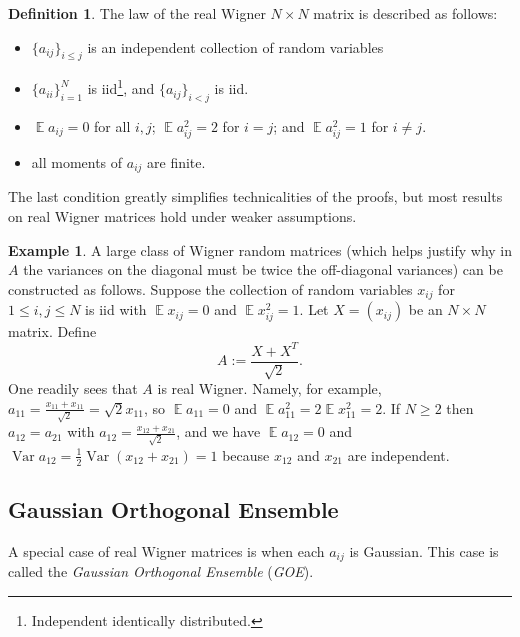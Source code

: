 \documentclass[letterpaper,11pt,oneside,reqno]{amsart}
\numberwithin{equation}{section}
\DeclareMathOperator{\EE}{\mathbb{E}}
\DeclareMathOperator{\VAR}{\mathrm{Var}}
\theoremstyle{definition}
\newtheorem{definition}[proposition]{Definition}
\newtheorem{example}[proposition]{Example}
\begin{document}
\begin{definition}\label{def:real_Wigner}
The law of the real Wigner $N\times N$ matrix is described as follows:
\begin{itemize}
	\item $\{a_{ij}\}_{i\leq j}$ is an independent collection of random variables
	\item $\{a_{ii}\}_{i=1}^N$ is iid\footnote{Independent identically
	distributed.}, and $\{a_{ij}\}_{i<j}$ is iid.
	\item $\EE a_{ij}=0$ for all $i,j$; $\EE a_{ij}^2=2$ for $i=j$; and $\EE a_{ij}^2=1$ for $i\neq j$.
	\item all moments of $a_{ij}$ are finite.
\end{itemize}
The last condition greatly simplifies technicalities of the proofs,
but most results on real Wigner matrices hold under weaker assumptions.
\end{definition}

\begin{example}
A large class of Wigner random matrices
(which helps justify why in $A$ the variances on the diagonal must be twice the 
off-diagonal
variances) can be constructed as follows.
Suppose the collection of random variables $x_{ij}$ for $1\leq i,j\leq N$ is iid with $\EE x_{ij}=0$ and $\EE x_{ij}^2=1$.  Let $X=(x_{ij})$ be an $N\times N$ matrix.  Define
\begin{equation*}
	A:=\frac{X+X^T}{\sqrt{2}}.
\end{equation*}
One readily sees that $A$ is real Wigner. Namely, for example,
$a_{11}=\frac{x_{11}+x_{11}}{\sqrt 2}=\sqrt 2 x_{11}$, so $\EE a_{11}=0$ 
and $\EE a_{11}^2=2\EE x_{11}^2=2$.  If $N\geq 2$ then $a_{12}=a_{21}$ with $a_{12}=\frac{x_{12}+x_{21}}{\sqrt 2}$, 
and we have $\EE a_{12}=0$ and $\VAR a_{12}=\frac{1}{2}\VAR(x_{12}+x_{21})=1$ because $x_{12}$ and $x_{21}$ are independent.
\end{example}


\subsection{Gaussian Orthogonal Ensemble} %
\label{sub:gaussian_orthogonal_ensemble}

A special case of real Wigner matrices  is when each $a_{ij}$ is Gaussian.
This case is called the \emph{Gaussian Orthogonal Ensemble} (\emph{GOE}).
\end{document}
